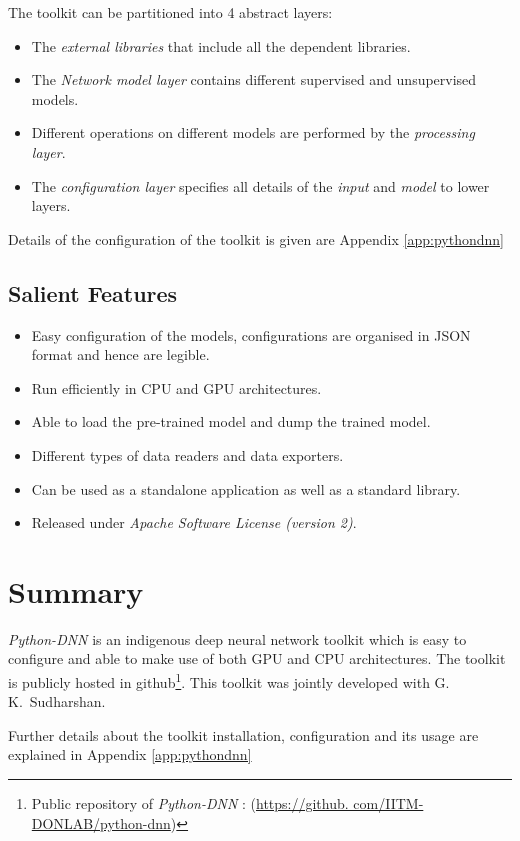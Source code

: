 \noindent The toolkit can be partitioned into 4 abstract layers:
\begin{itemize}
\item The \textit{external libraries} that include all the dependent libraries.
\item The \textit{Network model layer} contains different supervised and unsupervised models.
\item Different operations on different models are performed by the \textit{processing layer}.
\item The \textit{configuration layer} specifies all details of the \textit{input} and \textit{model} to lower layers.
\end{itemize}

Details of the configuration of the toolkit is given are Appendix \ref{app:pythondnn}

\subsection{Salient Features}
\label{sec:python-dnnFeatures}
\begin{itemize}
\item Easy configuration of the models, configurations
are organised in JSON format and hence are legible.
\item Run efficiently in CPU and GPU architectures.
\item Able to load the pre-trained model and dump the trained model.
\item Different types of data readers and data exporters.
\item Can be used as a standalone application as well as a standard  library.
\item Released under \textit{Apache Software License (version 2)}.\\
\end{itemize}

\section{Summary}
\textit{Python-DNN} is an indigenous deep neural network toolkit which is easy to configure and able to make use of both GPU and CPU architectures.  The toolkit is publicly hosted in github\footnote{Public repository of \textit{Python-DNN} : (\url{https://github.  com/IITM-DONLAB/python-dnn})}.  This toolkit was jointly developed with G.~ K.~Sudharshan.

Further details about the toolkit installation, configuration and its usage are explained in Appendix \ref{app:pythondnn}
